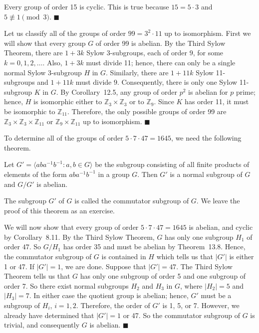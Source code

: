 
Every group of order 15 is cyclic.  This is true because $15 = 5 \cdot
3$ and $5 \not\equiv 1 \pmod{3}$. 
\hspace{\fill} $\blacksquare$
 
 
\medskip
 
 
Let us classify all of the groups of order $99 = 3^2 \cdot 11$ up to
isomorphism. First we will show that every group $G$ of order 99 is
abelian.  By the Third Sylow Theorem, there are $1 + 3k$ Sylow
3-subgroups, each of order $9$, for some $k = 0, 1, 2, \ldots$.  Also,
$1 + 3k$ must divide 11; hence, there can only be a single normal
Sylow 3-subgroup $H$ in $G$.  Similarly, there are $1 +11k$ Sylow
11-subgroups and $1 +11k$ must divide $9$.  Consequently, there is
only one Sylow 11-subgroup $K$ in $G$.  By Corollary~12.5, any group
of order $p^2$ is abelian for $p$ prime; hence, $H$ is isomorphic either 
to ${\mathbb Z}_3 \times {\mathbb Z}_3$ or to ${\mathbb Z}_9$.  Since $K$ has 
order 11, it must be isomorphic to ${\mathbb Z}_{11}$.  Therefore, the only
possible groups of order 99 are ${\mathbb Z}_3 \times {\mathbb Z}_3 \times
{\mathbb Z}_{11}$ or ${\mathbb Z}_9 \times {\mathbb Z}_{11}$ up to isomorphism.
\hspace{\fill} $\blacksquare$
 
 
\medskip
 
 
To determine all of the groups of order $5 \cdot 7 \cdot 47 = 1645$,
we need the following theorem. 
 
 
\begin{theorem}
Let $G' = \langle a b a^{-1} b^{-1} : a, b \in G \rangle$ be the
subgroup  consisting of all finite products of elements of the form
$aba^{-1}b^{-1}$ in a group $G$. Then $G'$ is a normal subgroup of $G$
and $G/G'$ is abelian. 
\end{theorem}
 
 
The subgroup $G'$ of $G$ is called the {\bfi commutator
subgroup\/} of $G$. We leave the proof of
this theorem as an exercise. 
 
 
\medskip
 
 
We will now show that every group of order $5 \cdot 7 \cdot 47 =
1645$ is abelian, and cyclic by Corollary~8.11. By the Third Sylow
Theorem, $G$ has only one subgroup $H_1$ of order $47$.  So $G/H_1$
has order 35 and must be abelian by Theorem~13.8. Hence, the
commutator subgroup of $G$ is contained in $H$ which tells us that
$|G'|$ is either 1 or 47. If $|G'|=1$, we are done. Suppose that
$|G'|=47$. The Third Sylow Theorem tells us that $G$ has only one
subgroup of order 5 and one subgroup of order 7.  So there exist
normal subgroups $H_2$  and $H_3$ in $G$, where $|H_2| = 5$ and $|H_3|
= 7$. In either case the quotient group is abelian; hence, $G'$ must
be a subgroup of $H_i$, $i= 1, 2$. Therefore, the order of $G'$ is 1,
5, or 7. However, we already have determined that $|G'| =1$ or 47. So
the commutator subgroup of $G$ is trivial, and consequently $G$ is
abelian.
\hspace{\fill} $\blacksquare$
 
